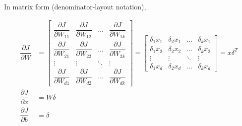 \documentclass{article} %
\begin{document}
    In matrix form (denominator-layout notation),

    $$
    \begin{aligned}
    \dfrac{\partial J}{\partial W}&=\begin{bmatrix} \dfrac{\partial J}{\partial W_{11}} & \dfrac{\partial J}{\partial W_{12}} & \dots & \dfrac{\partial J}{\partial W_{1 k}} \\ \dfrac{\partial J}{\partial W_{21}} & \dfrac{\partial J}{\partial W_{22}} & \dots & \dfrac{\partial J}{\partial W_{2 k}} \\ \vdots & \vdots & \ddots & \vdots \\ \dfrac{\partial J}{\partial W_{d 1}} & \dfrac{\partial J}{\partial W_{d 2}} & \dots & \dfrac{\partial J}{\partial W_{d k}} \end{bmatrix}=\begin{bmatrix} \delta_{1} x_{1} & \delta_{2} x_{1} & \dots & \delta_{k} x_{1} \\ \delta_{1} x_{2} & \delta_{2} x_{2} & \dots & \delta_{k} x_{2} \\ \vdots & \vdots & \ddots & \vdots \\ \delta_{1} x_{d} & \delta_{2} x_{d} & \dots & \delta_{k} x_{d} \end{bmatrix}=x\delta^{T}\\
    \dfrac{\partial J}{\partial x}&=W\delta\\
    \dfrac{\partial J}{\partial b}&=\delta
    \end{aligned}
    $$
    
\end{document}
